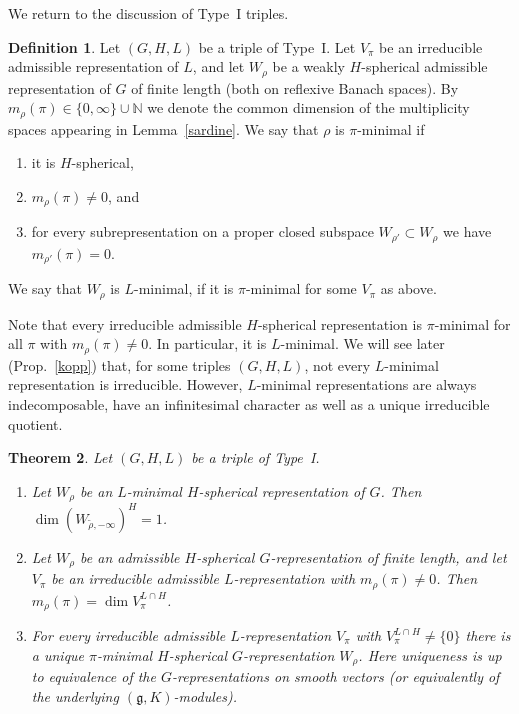 \documentclass[10]{amsart}
\newtheorem{thm}{Theorem}[section]
\theoremstyle{remark}
\theoremstyle{definition}
\newtheorem{Def}[thm]{Definition}
\numberwithin{equation}{section}
\newcommand{\N}{\mathbb{N}}           %
\newcommand{\fg}{{\mathfrak g}}
\begin{document}
{We return to the discussion of Type~I triples.

\begin{Def}\label{spass}
Let $(G,H,L)$ be a triple of Type~I. Let $V_\pi$ be an irreducible admissible representation of $L$, and let $W_\rho$ be a weakly $H$-spherical admissible representation of $G$ of finite length (both on reflexive Banach spaces). By $m_\rho(\pi)\in \{0,\infty\}\cup \N$ we denote the common dimension of the multiplicity spaces appearing in 
Lemma~\ref{sardine}. 
We say that $\rho$ is $\pi$-minimal if
\begin{enumerate}
\item[(i)] it is $H$-spherical,
\item[(ii)] $m_\rho(\pi)\ne 0$, and
\item[(iii)] for every subrepresentation on a proper closed subspace $W_{\rho'}\subset W_\rho$ we have $m_{\rho'}(\pi)=0$.
\end{enumerate}
We say that $W_\rho$ is $L$-minimal, if it is $\pi$-minimal for some $V_\pi$ as above.
\end{Def}

Note that every irreducible admissible $H$-spherical representation is $\pi$-minimal for all $\pi$ with $m_\rho(\pi)\ne 0$. In particular, it is $L$-minimal. We will see later (Prop.~\ref{kopp}) that, for some triples
$(G,H,L)$, not every $L$-minimal representation is irreducible. However, $L$-minimal representations are always indecomposable, have an infinitesimal character as well as a unique irreducible quotient. 

\begin{thm}\label{aal}
Let $(G,H,L)$ be a triple of Type~I.
\begin{enumerate}
\item[(i)] Let $W_\rho$ be an $L$-minimal $H$-spherical representation of $G$. Then $\dim (W_{\tilde\rho,-\infty})^H=1$.
\item[(ii)] Let $W_\rho$ be an admissible $H$-spherical $G$-representation of finite length, and let $V_\pi$ be an irreducible admissible $L$-representation with $m_\rho(\pi)\ne 0$.
Then $m_\rho(\pi)=\dim V_\pi^{L\cap H}$.
\item[(iii)]For every irreducible admissible $L$-representation $V_\pi$ with $V_\pi^{L\cap H}\ne\{0\}$ there is a unique $\pi$-minimal $H$-spherical $G$-representation $W_\rho$.
Here uniqueness is up to equivalence of the $G$-representations on smooth vectors (or equivalently of the underlying $(\fg,K)$-modules).
\end{enumerate}
\end{thm}

}
\end{document}
